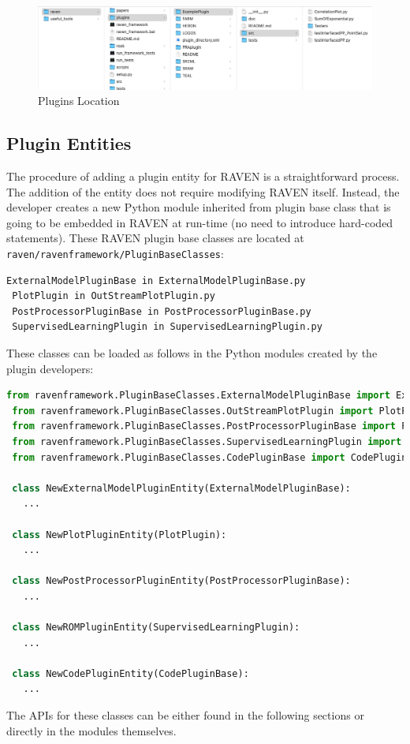 \begin{figure}
\centering
\includegraphics[width=1.0\textwidth]{pics/plugins_location.png}
\caption{Plugins Location}
\label{fig:pluginsLocation}
\end{figure}

\subsection{Plugin Entities}
The procedure of adding a plugin entity for RAVEN is a straightforward process.
The addition of the entity does not require modifying RAVEN itself.
Instead, the developer creates a new Python module inherited from plugin base class that is going to be embedded
in RAVEN at run-time (no need to introduce  hard-coded statements). These RAVEN plugin base
classes are located at \texttt{raven/ravenframework/PluginBaseClasses}:
\begin{lstlisting}[language=bash]
 ExternalModelPluginBase in ExternalModelPluginBase.py
 PlotPlugin in OutStreamPlotPlugin.py
 PostProcessorPluginBase in PostProcessorPluginBase.py
 SupervisedLearningPlugin in SupervisedLearningPlugin.py
\end{lstlisting}
These classes can be loaded as follows in the Python modules created by the plugin developers:
\begin{lstlisting}[language=python, basicstyle=\scriptsize\ttfamily, breaklines=True, columns=fullflexible]
 from ravenframework.PluginBaseClasses.ExternalModelPluginBase import ExternalModelPluginBase
 from ravenframework.PluginBaseClasses.OutStreamPlotPlugin import PlotPlugin
 from ravenframework.PluginBaseClasses.PostProcessorPluginBase import PostProcessorPluginBase
 from ravenframework.PluginBaseClasses.SupervisedLearningPlugin import SupervisedLearningPlugin
 from ravenframework.PluginBaseClasses.CodePluginBase import CodePluginBase

 class NewExternalModelPluginEntity(ExternalModelPluginBase):
   ...

 class NewPlotPluginEntity(PlotPlugin):
   ...

 class NewPostProcessorPluginEntity(PostProcessorPluginBase):
   ...

 class NewROMPluginEntity(SupervisedLearningPlugin):
   ...

 class NewCodePluginEntity(CodePluginBase):
   ...

\end{lstlisting}
The APIs for these classes can be either found in the following sections or directly in the modules themselves.

